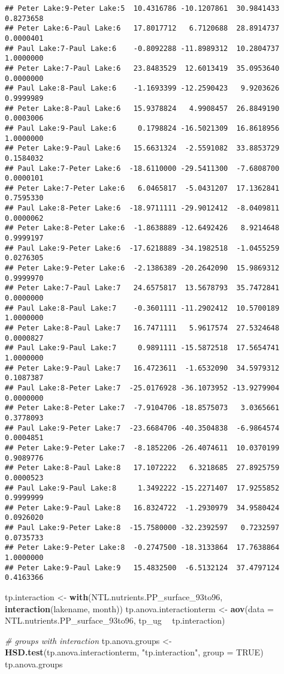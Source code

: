 \documentclass[
]{article}
\newenvironment{Shaded}{\begin{snugshade}}{\end{snugshade}}
\newcommand{\CommentTok}[1]{\textcolor[rgb]{0.56,0.35,0.01}{\textit{#1}}}
\newcommand{\DataTypeTok}[1]{\textcolor[rgb]{0.13,0.29,0.53}{#1}}
\newcommand{\KeywordTok}[1]{\textcolor[rgb]{0.13,0.29,0.53}{\textbf{#1}}}
\newcommand{\NormalTok}[1]{#1}
\newcommand{\OperatorTok}[1]{\textcolor[rgb]{0.81,0.36,0.00}{\textbf{#1}}}
\newcommand{\OtherTok}[1]{\textcolor[rgb]{0.56,0.35,0.01}{#1}}
\newcommand{\StringTok}[1]{\textcolor[rgb]{0.31,0.60,0.02}{#1}}
\begin{document}
\begin{verbatim}
## Peter Lake:9-Peter Lake:5  10.4316786 -10.1207861  30.9841433 0.8273658
## Peter Lake:6-Paul Lake:6   17.8017712   6.7120688  28.8914737 0.0000401
## Paul Lake:7-Paul Lake:6    -0.8092288 -11.8989312  10.2804737 1.0000000
## Peter Lake:7-Paul Lake:6   23.8483529  12.6013419  35.0953640 0.0000000
## Paul Lake:8-Paul Lake:6    -1.1693399 -12.2590423   9.9203626 0.9999989
## Peter Lake:8-Paul Lake:6   15.9378824   4.9908457  26.8849190 0.0003006
## Paul Lake:9-Paul Lake:6     0.1798824 -16.5021309  16.8618956 1.0000000
## Peter Lake:9-Paul Lake:6   15.6631324  -2.5591082  33.8853729 0.1584032
## Paul Lake:7-Peter Lake:6  -18.6110000 -29.5411300  -7.6808700 0.0000101
## Peter Lake:7-Peter Lake:6   6.0465817  -5.0431207  17.1362841 0.7595330
## Paul Lake:8-Peter Lake:6  -18.9711111 -29.9012412  -8.0409811 0.0000062
## Peter Lake:8-Peter Lake:6  -1.8638889 -12.6492426   8.9214648 0.9999197
## Paul Lake:9-Peter Lake:6  -17.6218889 -34.1982518  -1.0455259 0.0276305
## Peter Lake:9-Peter Lake:6  -2.1386389 -20.2642090  15.9869312 0.9999970
## Peter Lake:7-Paul Lake:7   24.6575817  13.5678793  35.7472841 0.0000000
## Paul Lake:8-Paul Lake:7    -0.3601111 -11.2902412  10.5700189 1.0000000
## Peter Lake:8-Paul Lake:7   16.7471111   5.9617574  27.5324648 0.0000827
## Paul Lake:9-Paul Lake:7     0.9891111 -15.5872518  17.5654741 1.0000000
## Peter Lake:9-Paul Lake:7   16.4723611  -1.6532090  34.5979312 0.1087387
## Paul Lake:8-Peter Lake:7  -25.0176928 -36.1073952 -13.9279904 0.0000000
## Peter Lake:8-Peter Lake:7  -7.9104706 -18.8575073   3.0365661 0.3778093
## Paul Lake:9-Peter Lake:7  -23.6684706 -40.3504838  -6.9864574 0.0004851
## Peter Lake:9-Peter Lake:7  -8.1852206 -26.4074611  10.0370199 0.9089776
## Peter Lake:8-Paul Lake:8   17.1072222   6.3218685  27.8925759 0.0000523
## Paul Lake:9-Paul Lake:8     1.3492222 -15.2271407  17.9255852 0.9999999
## Peter Lake:9-Paul Lake:8   16.8324722  -1.2930979  34.9580424 0.0926020
## Paul Lake:9-Peter Lake:8  -15.7580000 -32.2392597   0.7232597 0.0735733
## Peter Lake:9-Peter Lake:8  -0.2747500 -18.3133864  17.7638864 1.0000000
## Peter Lake:9-Paul Lake:9   15.4832500  -6.5132124  37.4797124 0.4163366
\end{verbatim}

\begin{Shaded}
\begin{Highlighting}[]
\NormalTok{tp.interaction <-}\StringTok{ }\KeywordTok{with}\NormalTok{(NTL.nutrients.PP_surface_93to96, }\KeywordTok{interaction}\NormalTok{(lakename, month))}
\NormalTok{tp.anova.interactionterm <-}\StringTok{ }\KeywordTok{aov}\NormalTok{(}\DataTypeTok{data =}\NormalTok{ NTL.nutrients.PP_surface_93to96, tp_ug }\OperatorTok{~}\StringTok{ }\NormalTok{tp.interaction)}

\CommentTok{# groups with interaction}
\NormalTok{tp.anova.groups <-}\StringTok{ }\KeywordTok{HSD.test}\NormalTok{(tp.anova.interactionterm, }\StringTok{"tp.interaction"}\NormalTok{, }\DataTypeTok{group =} \OtherTok{TRUE}\NormalTok{)}
\NormalTok{tp.anova.groups}
\end{Highlighting}
\end{Shaded}
\end{document}
